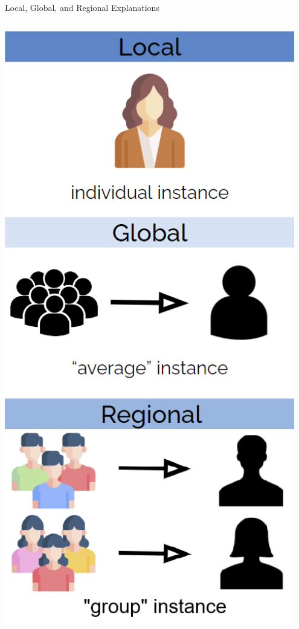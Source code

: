 \documentclass[11pt,compress,t,notes=noshow, aspectratio=169, xcolor=table]{beamer}
\begin{document}
\begin{frame}{Local, Global, and Regional Explanations}
\begin{columns}[c, totalwidth=\textwidth]
    \begin{column}{0.33\textwidth}
    \centering
    \includegraphics[width=0.95\textwidth]{figure/local_regional_global_col.png}
    
    \end{column}
\end{columns}
\end{frame}
\end{document}
